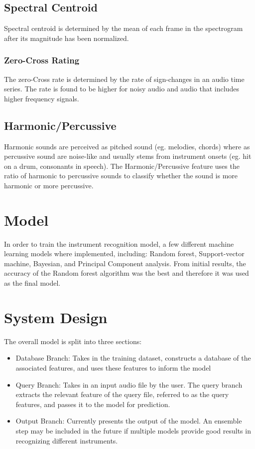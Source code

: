 \documentclass{article}
\begin{document}
\subsection{Spectral Centroid}
Spectral centroid is determined by the mean of each frame in the spectrogram after its magnitude has been normalized.

\subsubsection{Zero-Cross Rating}
The zero-Cross rate is determined by the rate of sign-changes in an audio time series. The rate is found to be higher for noisy audio and audio that includes higher frequency signals.

\subsection{Harmonic/Percussive}
Harmonic sounds are perceived as pitched sound (eg. melodies, chords) where as percussive sound are noise-like and usually stems from instrument onsets (eg. hit on a drum, consonants in speech). The Harmonic/Percussive feature uses the ratio of harmonic to percussive sounds to classify whether the sound is more harmonic or more percussive.

\section{Model}

In order to train the instrument recognition model, a few different machine learning models where implemented, including: Random forest, Support-vector machine, Bayesian, and Principal Component analysis. From initial results, the accuracy of the Random forest algorithm was the best and therefore it was used as the final model.

\section{System Design}
\label{system}

The overall model is split into three sections: 
\begin{itemize}
    \item Database Branch: Takes in the training dataset, constructs a database of the associated features, and uses these features to inform the model
    \item Query Branch: Takes in an input audio file by the user. The query branch extracts the relevant feature of the query file, referred to as the query features, and passes it to the model for prediction.
    \item Output Branch: Currently presents the output of the model. An ensemble step may be included in the future if multiple models provide good results in recognizing different instruments.
\end{itemize}
\end{document}

